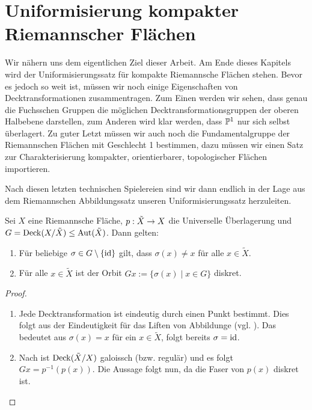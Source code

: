 \section{Uniformisierung kompakter Riemannscher Flächen}
\label{sec:uniformisierung}

Wir nähern uns dem eigentlichen Ziel dieser Arbeit. Am Ende dieses
Kapitels wird der Uniformisierungssatz für kompakte Riemannsche
Flächen stehen. Bevor es jedoch so weit ist, müssen wir noch einige
Eigenschaften von Decktransformationen zusammentragen. Zum Einen
werden wir sehen, dass genau die Fuchsschen Gruppen die möglichen
Decktransformationsgruppen der oberen Halbebene darstellen, zum Anderen
wird klar werden, dass $\P^1$ nur sich selbst überlagert. Zu guter
Letzt müssen wir auch noch die Fundamentalgruppe der Riemannschen
Flächen mit Geschlecht 1 bestimmen, dazu müssen wir einen Satz zur
Charakterisierung kompakter, orientierbarer, topologischer Flächen
importieren.

Nach diesen letzten technischen Spielereien sind wir dann endlich in
der Lage aus dem Riemannschen Abbildungssatz unseren
Uniformisierungssatz herzuleiten.

\begin{lemma}
  \label{lemma:decktrafo-diskret}
  Sei $X$ eine Riemannsche Fläche, $p: \tilde X \ra X$ die
  Universelle Überlagerung und $G = \Deck(X /\tilde X) \leq
  \Aut(\tilde X)$. Dann gelten:
  \begin{enumerate}
  \item Für beliebige $\sigma \in G \setminus \{\id\}$ gilt, dass $\sigma
    (x) \neq x $ für alle $x \in \tilde X$.
  \item Für alle $x \in \tilde X$ ist der Orbit $Gx := \{ \sigma(x)
    \mid x \in G\}$ diskret.
  \end{enumerate}
\end{lemma}

\begin{proof}
  \begin{enumerate}
  \item Jede Decktransformation ist eindeutig durch einen Punkt
    bestimmt. Dies folgt aus der Eindeutigkeit für das Liften von
    Abbildunge (vgl. \cite[Satz 4.8]{For}). Das bedeutet aus
    $\sigma(x) = x$ für ein $x \in \tilde X$, folgt
    bereits $\sigma = \id$.
  \item Nach \cite[Satz 5.6]{For} ist $\Deck(\tilde X/X)$ galoissch
    (bzw. regulär) und
    es folgt $Gx = p^{-1}(p(x))$. Die Aussage folgt nun, da die Faser
    von $p(x)$ diskret ist.
  \end{enumerate}
\end{proof}

